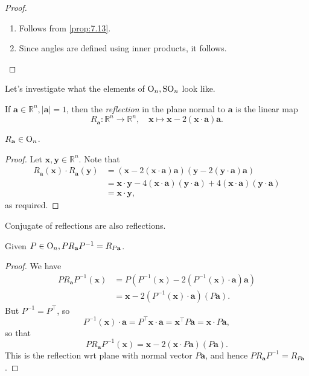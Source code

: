 \documentclass[a4paper]{article}
\begin{document}
    \begin{proof}
        \begin{enumerate}
            \item Follows from \ref{prop:7.13}.
            \item Since angles are defined using inner products, it follows.
        \end{enumerate}
    \end{proof}
    Let's investigate what the elements of $ \mathrm{O}_n, \mathrm{SO}_n $ look like.
    \begin{definition}
        If $ \mathbf{a}\in \mathbb{R}^{n}, |\mathbf{a}|=1 $, then the \textit{reflection} in the plane normal to $\mathbf{a}$ is the linear map 
        \[
            R_{\mathbf{a}}:\mathbb{R}^{n}\to \mathbb{R}^{n},\quad \mathbf{x} \mapsto \mathbf{x}-2(\mathbf{x} \cdot \mathbf{a})\mathbf{a}.
        \]
    \end{definition}
    \begin{proposition}\label{prop:7.15}
        $ R_\mathbf{a}\in \mathrm{O}_n $.
    \end{proposition}
    \begin{proof}
        Let $ \mathbf{x},\mathbf{y}\in \mathbb{R}^{n} $. Note that 
        \begin{align*}
            R_\mathbf{a}(\mathbf{x})\cdot R_\mathbf{a}(\mathbf{y}) &= (\mathbf{x}-2(\mathbf{x} \cdot \mathbf{a})\mathbf{a})(\mathbf{y}-2(\mathbf{y} \cdot \mathbf{a})\mathbf{a})\\
            &= \mathbf{x} \cdot \mathbf{y} - 4(\mathbf{x} \cdot \mathbf{a})(\mathbf{y} \cdot \mathbf{a})+4(\mathbf{x} \cdot \mathbf{a})(\mathbf{y} \cdot \mathbf{a})\\
            &=\mathbf{x} \cdot \mathbf{y},
        \end{align*}
        as required.
    \end{proof}
    Conjugate of reflections are also reflections.
    \begin{lemma}\label{lma:7.16}
        Given $ P\in \mathrm{O}_n, PR_\mathbf{a} P^{-1} = R_{P\mathbf{a}} $.
    \end{lemma}
    \begin{proof}
        We have
        \begin{align*}
            PR_\mathbf{a} P^{-1}(\mathbf{x}) &= P(P^{-1}(\mathbf{x})-2(P^{-1}(\mathbf{x}) \cdot \mathbf{a})\mathbf{a})\\
            &=\mathbf{x}-2(P^{-1}(\mathbf{x}) \cdot \mathbf{a})(P\mathbf{a}).
        \end{align*}
        But $ P^{-1}=P^\top $, so 
        \[
            P^{-1}(\mathbf{x}) \cdot \mathbf{a} = P^\top \mathbf{x} \cdot \mathbf{a} = \mathbf{x}^\top P \mathbf{a} = \mathbf{x} \cdot P\mathbf{a},
        \]
        so that 
        \[
            PR_\mathbf{a} P^{-1}(\mathbf{x}) = \mathbf{x}-2(\mathbf{x} \cdot P\mathbf{a})(P\mathbf{a}).
        \]
        This is the reflection wrt plane with normal vector $ P\mathbf{a} $, and hence $ PR_\mathbf{a} P^{-1} = R_{P\mathbf{a}} $.
    \end{proof}
\end{document}
